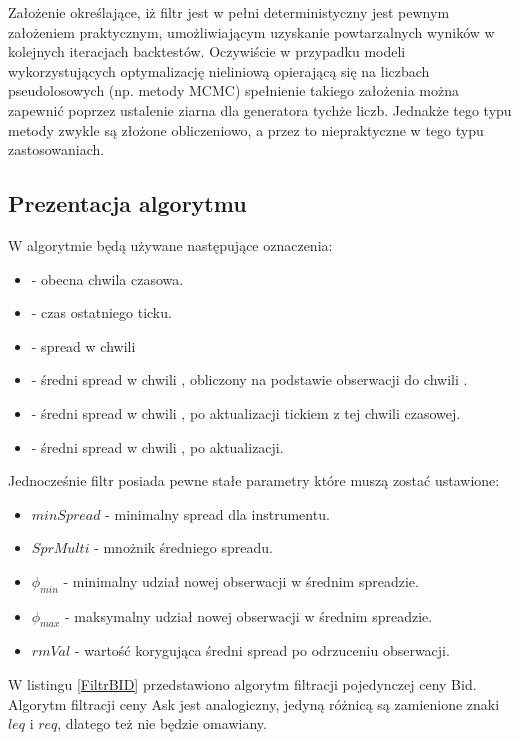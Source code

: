 \documentclass[a4paper,12pt,openany, DIV=calc, headsepline]{scrbook}
\begin{document}
Założenie określające, iż filtr jest w pełni deterministyczny jest pewnym założeniem praktycznym, umożliwiającym uzyskanie powtarzalnych wyników w kolejnych iteracjach backtestów. Oczywiście w przypadku modeli wykorzystujących optymalizację nieliniową opierającą się na liczbach pseudolosowych (np. metody MCMC) spełnienie takiego założenia można zapewnić poprzez ustalenie ziarna dla generatora tychże liczb. Jednakże tego typu metody zwykle są złożone obliczeniowo, a przez to niepraktyczne w tego typu zastosowaniach.  




\subsection{Prezentacja algorytmu}

W algorytmie będą używane następujące oznaczenia:

\begin{itemize}
\item \ts - obecna chwila czasowa.
\item \tsl - czas ostatniego ticku.
\item \Spt  - spread w chwili \ts
\item \MSpc - średni spread w chwili \ts, obliczony na podstawie obserwacji do chwili \tsl.
\item \MSpn - średni spread w chwili \ts, po aktualizacji tickiem z tej chwili czasowej.
\item \MSpo - średni spread w chwili \tsl, po aktualizacji.
\end{itemize}

Jednocześnie filtr posiada pewne stałe parametry które muszą zostać ustawione:

\begin{itemize}
\item $minSpread$ - minimalny spread dla instrumentu.
\item $SprMulti$ - mnożnik średniego spreadu.
\item $\phi_{min}$ - minimalny udział nowej obserwacji w średnim spreadzie.
\item $\phi_{max}$ - maksymalny udział nowej obserwacji w średnim spreadzie.
\item $rmVal$ - wartość korygująca średni spread po odrzuceniu obserwacji.
\end{itemize}

W listingu \ref{FiltrBID} przedstawiono algorytm filtracji pojedynczej ceny Bid. Algorytm filtracji ceny Ask jest analogiczny, jedyną różnicą są zamienione znaki $leq$ i $req$, dlatego też nie będzie omawiany.
\end{document}
